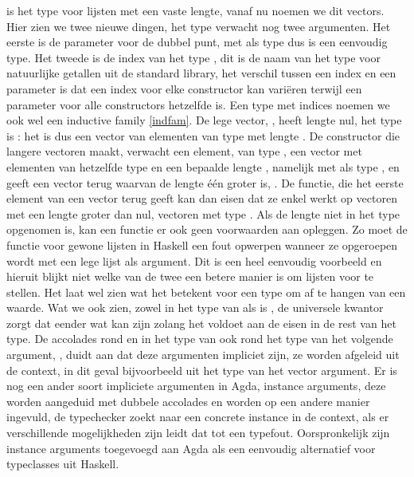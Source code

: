  is het type voor lijsten met een vaste lengte, vanaf nu noemen we
dit vectors. Hier zien we twee nieuwe dingen, het type  verwacht nog
twee argumenten. Het eerste is de parameter voor de dubbel punt,  met
als type  dus  is een eenvoudig type. Het tweede is de
index van het type , dit is de naam van het type voor natuurlijke
getallen uit de standard library, het verschil tussen een index en een
parameter is dat een index voor elke constructor kan variëren terwijl een
parameter voor alle constructors hetzelfde is. Een type met indices noemen we
ook wel een inductive family \ref{indfam}. De lege vector, \iagda{[]}, heeft
lengte nul, het type is : het is dus een vector van elementen
van type  met lengte . De constructor die langere vectoren
maakt, verwacht een element,  van type , een vector met
elementen van hetzelfde type  en een bepaalde lengte ,
namelijk  met als type , en geeft een vector terug
waarvan de lengte één groter is, . De 
functie, die het eerste element van een vector terug geeft kan dan eisen dat ze
enkel werkt op vectoren met een lengte groter dan nul, vectoren met type
. Als de lengte niet in het type opgenomen is, kan een
functie er ook geen voorwaarden aan opleggen. Zo moet de  functie
voor gewone lijsten in Haskell een fout opwerpen wanneer ze opgeroepen wordt
met een lege lijst als argument.  Dit is een heel eenvoudig voorbeeld en
hieruit blijkt niet welke van de twee een betere manier is om lijsten voor te
stellen.  Het laat wel zien wat het betekent voor een type om af te hangen van
een waarde. Wat we ook zien, zowel in het type van  als 
is , de universele kwantor zorgt dat  eender wat kan zijn
zolang het voldoet aan de eisen in de rest van het type. De accolades rond
 en in het type van  ook rond het type van het volgende
argument, , duidt aan dat deze argumenten impliciet zijn, ze
worden afgeleid uit de context, in dit geval bijvoorbeeld uit het type van het
vector argument. Er is nog een ander soort impliciete argumenten in Agda,
instance arguments, deze worden aangeduid met dubbele accolades en worden op
een andere manier ingevuld, de typechecker zoekt naar een concrete instance in
de context, als er verschillende mogelijkheden zijn leidt dat tot een typefout.
Oorspronkelijk zijn instance arguments toegevoegd aan Agda als een eenvoudig
alternatief voor typeclasses uit Haskell.


